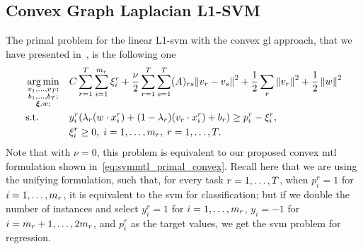 \subsection{Convex Graph Laplacian L1-SVM}
%
The primal problem for the linear L1-\acrshort{svm} with the convex \acrshort{gl} approach, that we have presented in~\citep*{RuizAD20}, is the following one
%
\begin{equation}\label{eq:primal_cvxgl_l1_linear}
    \begin{aligned}
         & \argmin_{\substack{v_1, \ldots, v_\ntasks ;                                                                                                                                                                                                                                                                                          \\ \substack{b_1, \ldots, b_\ntasks } ; \\ \substack{\fv{\xi}}, w; }}
         &                                             & { C \sum_{r=1}^\ntasks \sum_{i=1}^{\npertask_r} {\xi_i^r}  + \frac{\nu}{2} \sum_{r=1}^\ntasks \sum_{s=1}^T (A)_{rs} {\| {v}_r - {v}_s \|}^2 + \frac{1}{2} \sum_r \norm{{v}_r}^2 + \frac{1}{2} \norm{{w}}^2}                                                                              \\
         & \text{s.t.}
         &                                             & y_i^r (\lambda_r ({w} \cdot {x}_i^r) + (1 - \lambda_r) ({v}_r \cdot {x}_i^r) + b_r) \geq p_i^r - \xi_i^r  ,                                                                                                                                                                            \\
         &                                             &                                                                                                                                                                                                           & \xi_i^r \geq 0,  \;  i = 1, \dotsc, \npertask_r, \; r=1, \dotsc, \ntasks .
    \end{aligned}
\end{equation}
%
Note that with $\nu=0$, this problem is equivalent to our proposed convex \acrshort{mtl} formulation shown in~\eqref{eq:svmmtl_primal_convex}. Recall here that we are using the unifying formulation, such that, for every task $r=1, \ldots, T$, when $p_i^r = 1$ for $i=1, \ldots, m_r$, it is equivalent to the \acrshort{svm} for classification; but if we double the number of instances and select $y_i^r = 1$ for $i=1, \ldots, m_r$, $y_i= -1$ for $i = m_r+1, \ldots, 2 m_r$, and $p_i^r$ as the target values, we get the \acrshort{svm} problem for regression.
